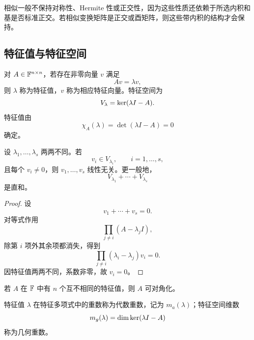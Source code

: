 \begin{remark}
相似一般不保持对称性、Hermite 性或正交性，因为这些性质还依赖于所选内积和基是否标准正交。若相似变换矩阵是正交或酉矩阵，则这些带内积的结构才会保持。
\end{remark}

\subsection{特征值与特征空间}

对 $A\in\mathbb F^{n\times n}$，若存在非零向量 $v$ 满足
\begin{equation}
 Av=\lambda v,
\end{equation}
则 $\lambda$ 称为特征值，$v$ 称为相应特征向量。特征空间为
\begin{equation}
 V_\lambda=\operatorname{ker}(\lambda I-A).
\end{equation}
特征值由
\begin{equation}
 \chi_A(\lambda)=\det(\lambda I-A)=0
\end{equation}
确定。

\begin{theorem}[不同特征空间的直和性]
设 $\lambda_1,\ldots,\lambda_s$ 两两不同。若
\begin{equation}
 v_i\in V_{\lambda_i},
 \qquad i=1,\ldots,s,
\end{equation}
且每个 $v_i\neq0$，则 $v_1,\ldots,v_s$ 线性无关。更一般地，
\begin{equation}
 V_{\lambda_1}+\cdots+V_{\lambda_s}
\end{equation}
是直和。
\end{theorem}

\begin{proof}
设
\begin{equation}
 v_1+\cdots+v_s=0.
\end{equation}
对等式作用
\begin{equation}
 \prod_{j\neq i}(A-\lambda_jI),
\end{equation}
除第 $i$ 项外其余项都消失，得到
\begin{equation}
 \prod_{j\neq i}(\lambda_i-\lambda_j)v_i=0.
\end{equation}
因特征值两两不同，系数非零，故 $v_i=0$。
\end{proof}

\begin{corollary}
若 $A$ 在 $\mathbb F$ 中有 $n$ 个互不相同的特征值，则 $A$ 可对角化。
\end{corollary}

\begin{definition}
特征值 $\lambda$ 在特征多项式中的重数称为代数重数，记为 $m_a(\lambda)$；特征空间维数
\begin{equation}
 m_g(\lambda)=\dim\operatorname{ker}(\lambda I-A)
\end{equation}
称为几何重数。
\end{definition}


